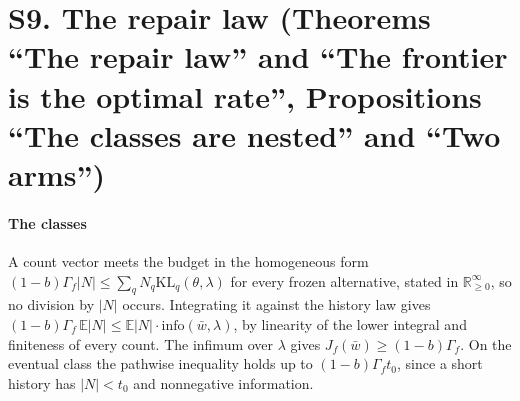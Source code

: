 
\section{S9. The repair law (Theorems ``The repair law'' and ``The frontier is the optimal
rate'', Propositions ``The classes are nested'' and ``Two arms'')}

\paragraph{The classes} A count vector meets the budget in the homogeneous form
$(1-b)\Gamma_f|N|\le\sum_qN_q\mathrm{KL}_q(\theta,\lambda)$ for every frozen alternative, stated in
$\mathbb R_{\ge0}^\infty$, so no division by $|N|$ occurs. Integrating it against the history law
gives $(1-b)\Gamma_f\,\mathbb E|N|\le\mathbb E|N|\cdot\mathrm{info}(\bar w,\lambda)$, by
linearity of the lower integral and finiteness of every count. The infimum over $\lambda$ gives
$J_f(\bar w)\ge(1-b)\Gamma_f$. On the eventual class the pathwise inequality holds up to
$(1-b)\Gamma_ft_0$, since a short history has $|N|<t_0$ and nonnegative information.

